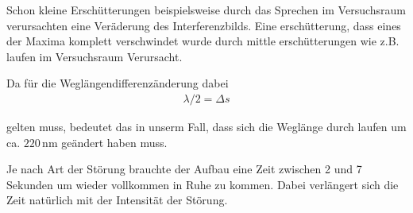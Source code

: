 
Schon kleine Erschütterungen beispielsweise durch das Sprechen im Versuchsraum verursachten eine Veräderung des Interferenzbilds. Eine erschütterung, dass eines der Maxima komplett verschwindet wurde durch mittle erschütterungen wie z.B. laufen im Versuchsraum Verursacht.

Da für die Weglängendifferenzänderung dabei
\begin{align}
  \lambda / 2 = \Delta s
\end{align}

gelten muss, bedeutet das in unserm Fall, dass sich die Weglänge durch laufen um ca. $220\, \text{nm}$ geändert haben muss.

Je nach Art der Störung brauchte der Aufbau eine Zeit zwischen 2 und 7 Sekunden um wieder vollkommen in Ruhe zu kommen. Dabei verlängert sich die Zeit natürlich mit der Intensität der Störung.
